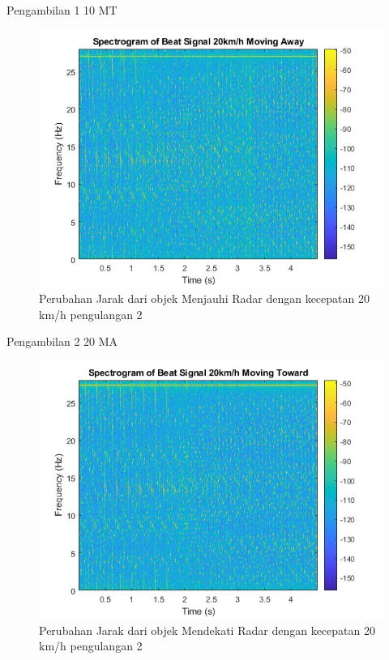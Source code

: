 Pengambilan 1 10 MT

\begin{figure}
	\centering
	\includegraphics[scale=0.6]{pics/bab5/Velocity/2_20MA.jpg}
	\caption{Perubahan Jarak dari objek Menjauhi Radar dengan kecepatan 20 km/h pengulangan 2}
	\label{fig:pengambilan2_20MA}
\end{figure}

Pengambilan 2 20 MA

\begin{figure}
	\centering
	\includegraphics[scale=0.6]{pics/bab5/Velocity/2_20MT.jpg}
	\caption{Perubahan Jarak dari objek Mendekati Radar dengan kecepatan 20 km/h pengulangan 2}
	\label{fig:pengambilan2_20MT}
\end{figure}

